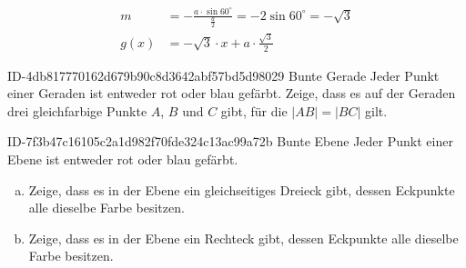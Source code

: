 \begin{exercise}
\begin{minipage}{40mm}
\begin{tikzpicture}
      \end{tikzpicture}
    \end{minipage}\hspace*{\fill}%
    \begin{minipage}{\linecalc}
      \begin{equation*}
        \begin{split}
          m&=-\frac{a\cdot\sin60^\circ}{\frac{a}{2}}=-2\sin60^\circ=-\sqrt{3} \\[2ex]
          g(x)&=-\sqrt{3}\cdot x+a\cdot\frac{\sqrt{3}}{2}
        \end{split}
      \end{equation*}
    \end{minipage}
  \fi
\end{exercise}

\begin{exercise}
      {ID-4db817770162d679b90c8d3642abf57bd5d98029}
      {Bunte Gerade}
  \ifproblem\problem
    Jeder Punkt einer Geraden ist entweder rot oder blau gefärbt.
    Zeige, dass es auf der Geraden drei gleichfarbige Punkte $A$,
    $B$ und $C$ gibt, für die $|AB|=|BC|$ gilt.
  \fi
\end{exercise}

\begin{exercise}
      {ID-7f3b47c16105c2a1d982f70fde324c13ac99a72b}
      {Bunte Ebene}
  \ifproblem\problem
    Jeder Punkt einer Ebene ist entweder rot oder blau gefärbt.
    \begin{enumerate}[a)]
      \item Zeige, dass es in der Ebene ein gleichseitiges Dreieck gibt,
            dessen Eckpunkte alle dieselbe Farbe besitzen.
      \item Zeige, dass es in der Ebene ein Rechteck gibt,
            dessen Eckpunkte alle dieselbe Farbe besitzen.
    \end{enumerate}
  \fi
\end{exercise}

